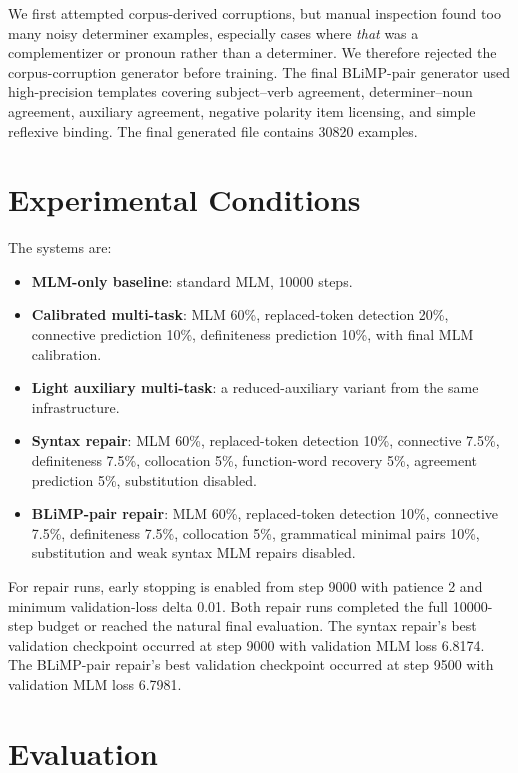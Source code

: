 \documentclass[11pt]{article}
\begin{document}
We first attempted corpus-derived corruptions, but manual inspection found too many noisy determiner examples, especially cases where \textit{that} was a complementizer or pronoun rather than a determiner. We therefore rejected the corpus-corruption generator before training. The final BLiMP-pair generator used high-precision templates covering subject--verb agreement, determiner--noun agreement, auxiliary agreement, negative polarity item licensing, and simple reflexive binding. The final generated file contains 30820 examples.

\section{Experimental Conditions}

The systems are:

\begin{itemize}
    \item \textbf{MLM-only baseline}: standard MLM, 10000 steps.
    \item \textbf{Calibrated multi-task}: MLM 60\%, replaced-token detection 20\%, connective prediction 10\%, definiteness prediction 10\%, with final MLM calibration.
    \item \textbf{Light auxiliary multi-task}: a reduced-auxiliary variant from the same infrastructure.
    \item \textbf{Syntax repair}: MLM 60\%, replaced-token detection 10\%, connective 7.5\%, definiteness 7.5\%, collocation 5\%, function-word recovery 5\%, agreement prediction 5\%, substitution disabled.
    \item \textbf{BLiMP-pair repair}: MLM 60\%, replaced-token detection 10\%, connective 7.5\%, definiteness 7.5\%, collocation 5\%, grammatical minimal pairs 10\%, substitution and weak syntax MLM repairs disabled.
\end{itemize}

For repair runs, early stopping is enabled from step 9000 with patience 2 and minimum validation-loss delta 0.01. Both repair runs completed the full 10000-step budget or reached the natural final evaluation. The syntax repair's best validation checkpoint occurred at step 9000 with validation MLM loss 6.8174. The BLiMP-pair repair's best validation checkpoint occurred at step 9500 with validation MLM loss 6.7981.

\section{Evaluation}
\end{document}
